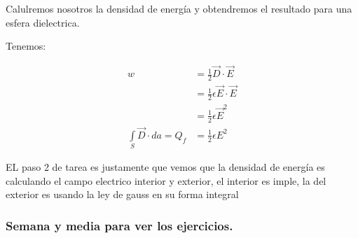 \documentclass{article}
\begin{document}
Calulremos nosotros la densidad de energía y obtendremos el resultado para una esfera dielectrica. 


Tenemos:


\begin{equation}
\begin{split}
w &= \frac{1}{2} \vec{D} \cdot \vec{E}\\
&= \frac{1}{2} \epsilon \vec{E} \cdot \vec{E}\\
&= \frac{1}{2} \epsilon \vec{E}^{2}\\
\boxed{\int\limits_{S} \vec{D} \cdot da = Q_{f}} &= \frac{1}{2}\epsilon E^{2}
\end{split}
\end{equation}


EL paso 2 de tarea es justamente que vemos que la densidad de energía es calculando el campo electrico interior y exterior, el interior es imple, la del exterior es usando la ley de gauss en su forma integral


\subsubsection{Semana y media para ver los ejercicios. }


  
\end{document}

